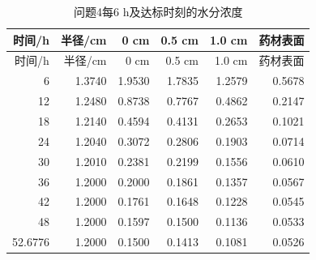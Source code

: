 \begin{longtable}{rrrrrr}
\caption{问题4每6 h及达标时刻的水分浓度}\label{tab:q4}\\
\toprule
时间/h & 半径/cm & 0 cm & 0.5 cm & 1.0 cm & 药材表面 \\
\midrule
\endfirsthead
\toprule
时间/h & 半径/cm & 0 cm & 0.5 cm & 1.0 cm & 药材表面 \\
\midrule
\endhead
6 & 1.3740 & 1.9530 & 1.7835 & 1.2579 & 0.5678 \\
12 & 1.2480 & 0.8738 & 0.7767 & 0.4862 & 0.2147 \\
18 & 1.2140 & 0.4594 & 0.4131 & 0.2653 & 0.1021 \\
24 & 1.2040 & 0.3072 & 0.2806 & 0.1903 & 0.0714 \\
30 & 1.2010 & 0.2381 & 0.2199 & 0.1556 & 0.0610 \\
36 & 1.2000 & 0.2000 & 0.1861 & 0.1357 & 0.0567 \\
42 & 1.2000 & 0.1761 & 0.1648 & 0.1228 & 0.0545 \\
48 & 1.2000 & 0.1597 & 0.1500 & 0.1136 & 0.0533 \\
52.6776 & 1.2000 & 0.1500 & 0.1413 & 0.1081 & 0.0526 \\
\bottomrule
\end{longtable}

